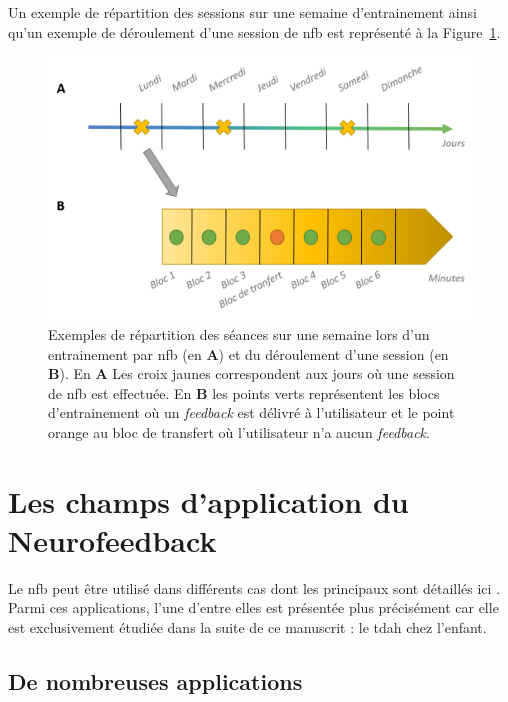 Un exemple de répartition des sessions sur une semaine d'entrainement ainsi qu'un exemple de déroulement d'une session de \gls{nfb} est représenté à la
Figure~\ref{Figure:introduction_timeline_session}. 

\begin{figure}[h!]
  \centering
	\includegraphics[width=1\linewidth]{figures/chapter-1/introduction-timeline-session} 
  \caption[Exemple de déroulement d'un traitement par \gls{nfb}.]{Exemples de répartition 
	des séances sur une semaine lors d'un entrainement par \gls{nfb} (en \textbf{A}) et du déroulement d'une session (en \textbf{B}). 
	En \textbf{A} Les croix jaunes correspondent aux jours où une session de \gls{nfb} est effectuée. En \textbf{B} les points verts représentent les blocs d'entrainement où un \textit{feedback}
	est délivré à l'utilisateur et le point orange au bloc de transfert où l'utilisateur n'a aucun \textit{feedback}.}
  \label{Figure:introduction_timeline_session}
\end{figure}

\section{Les champs d'application du Neurofeedback} \label{applications_NFB}

Le \gls{nfb} peut être utilisé dans différents cas dont les principaux sont détaillés ici \citep{Marzbani2016}. Parmi ces applications, l'une d'entre elles est présentée 
plus précisément car elle est exclusivement étudiée dans la suite de ce manuscrit : le \gls{tdah} chez l'enfant.

\subsection{De nombreuses applications} \label{NFB_applications}

